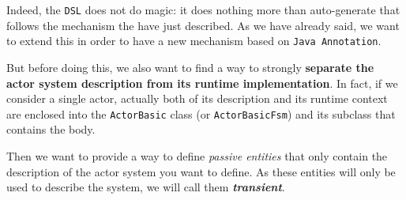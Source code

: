 Indeed, the \texttt{DSL} does not do magic: it does nothing more than auto-generate that follows the mechanism the have just described.
As we have already said, we want to extend this in order to have a new mechanism based on \texttt{Java Annotation}.

But before doing this, we also want to find a way to strongly \textbf{separate the actor system description from its runtime implementation}. In fact, if we consider a single actor, actually both of its description and its runtime context are enclosed into the \texttt{ActorBasic} class (or \texttt{ActorBasicFsm}) and its subclass that contains the body.

Then we want to provide a way to define \textit{passive entities} that only contain the description of the actor system you want to define. As these entities will only be used to describe the system, we will call them \textbf{\textit{transient}}. 

